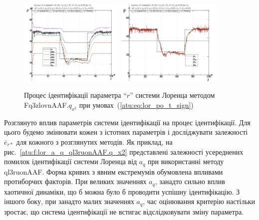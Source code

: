 \documentclass[a4paper,13pt]{atuaref}
\begin{document}
\begin{figure}[ht!]
  \centerline{
    \includegraphics[width=0.45\textwidth]{p5/p/cha/lor/Fq3zlovnAAF/lor_Fq3zlovnAAF_qx2-pl_n_sign.png}
    \hfill
    \includegraphics[width=0.45\textwidth]{p5/p/cha/lor/Fq3zlovnAAF/lor_Fq3zlovnAAF_qx2-p_p_sign.png}
  }
  \caption{Процес ідентифікації параметра ``$r$'' системи Лоренца методом Fq3zlovnAAF.$q_{x^2}$ при умовах~(\ref{atu:eq:lor_po_t_sign})}
  \label{atu:f:lor_id_Fq3zlovnAAF.q_x2_sign}
\end{figure}


Розглянуто вплив параметрів системи ідентифікації на процес ідентифікації. Для
цього будемо змінювати кожен з істотних параметрів і досліджувати
залежності $\overline {e}_{r*} $ для кожного з розглянутих методів.
Як приклад,
на рис.~\ref{atu:f:lor_a_q_ql3ruonAAF.q_x2} представлені залежності
усереднених помилок ідентифікації системи Лоренца від $ a_q $ при використанні
методу ql3ruonAAF.
Форма кривих з явним екстремумів обумовлена впливами протиборчих
факторів. При великих значеннях $ a_q $, занадто сильно вплив хаотичної
динаміки, що б можна було б проводити успішну ідентифікацію. З іншого боку, при
занадто малих значеннях $ a_q $, час оцінювання критерію настільки зростає, що
система ідентифікації не встигає відслідковувати зміну параметра.
\end{document}
